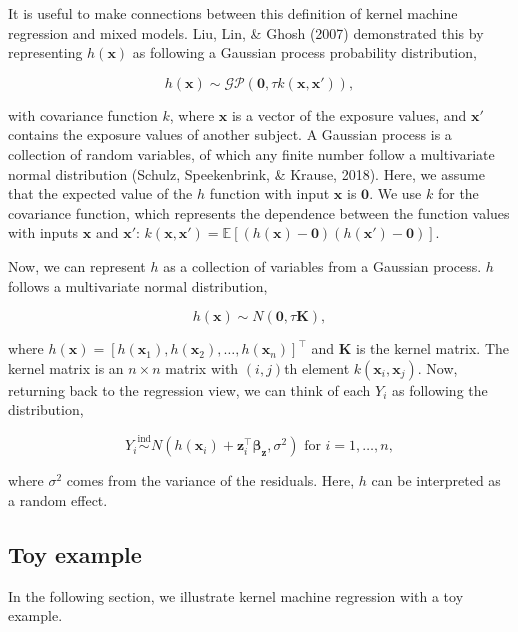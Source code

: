 \documentclass[12pt, twoside]{amherstthesis}
\begin{document}
It is useful to make connections between this definition of kernel machine regression and mixed models. Liu, Lin, \& Ghosh (2007) demonstrated this by representing \(h(\textbf{x})\) as following a Gaussian process probability distribution,

\[
h(\textbf{x}) \sim \mathcal{GP}(\textbf{0}, \tau k(\textbf{x}, \textbf{x}')),
\]

\noindent with covariance function \(k\), where \(\textbf{x}\) is a vector of the exposure values, and \(\textbf{x}'\) contains the exposure values of another subject. A Gaussian process is a collection of random variables, of which any finite number follow a multivariate normal distribution (Schulz, Speekenbrink, \& Krause, 2018). Here, we assume that the expected value of the \(h\) function with input \(\textbf{x}\) is \(\textbf{0}\). We use \(k\) for the covariance function, which represents the dependence between the function values with inputs \(\textbf{x}\) and \(\textbf{x}'\): \(k(\textbf{x}, \textbf{x}') = \mathbb{E}[(h(\textbf{x})- \textbf{0}) (h(\textbf{x}')- \textbf{0})]\).

Now, we can represent \(h\) as a collection of variables from a Gaussian process. \(h\) follows a multivariate normal distribution,

\[
h({\textbf{x}}) \sim N(\textbf{0}, \tau\textbf{K}),
\]

\noindent where \(h({\textbf{x}}) = [h(\textbf{x}_1), h(\textbf{x}_2), \dots, h(\textbf{x}_n)]^\top\) and \(\textbf{K}\) is the kernel matrix. The kernel matrix is an \(n \times n\) matrix with \((i, j)\)th element \(k(\textbf{x}_i, \textbf{x}_j)\). Now, returning back to the regression view, we can think of each \(Y_i\) as following the distribution,

\[
Y_i \overset{\mathrm{ind}}{\sim} N(h(\textbf{x}_i) + \textbf{z}_i^\top \boldsymbol{\beta}_{\textbf{z}}, \sigma^2) \text{ for } i = 1,\dots,n,
\]

\noindent where \(\sigma^2\) comes from the variance of the residuals. Here, \(h\) can be interpreted as a random effect.

\hypertarget{bkmrtoy}{%
\subsection{Toy example}\label{bkmrtoy}}

In the following section, we illustrate kernel machine regression with a toy example.
\end{document}
